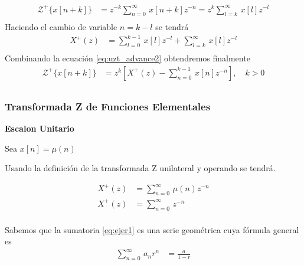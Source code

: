 \documentclass[12pt]{article}
\begin{document}
\begin{equation}
    \begin{split}
        \mathscr{Z}^+\{x[n+k]\}&=z^{-k}\displaystyle\sum_{n=0}^{\infty}\,x[n+k]z^{-n}=z^{k}\displaystyle\sum_{l=k}^{\infty}\,x[l]z^{-l}\\
    \end{split}
    \label{eq:uzt_advance1}
\end{equation}
Haciendo el cambio de variable $n=k-l$ se tendrá
\begin{equation}
    \begin{split}
        X^+(z)&=\displaystyle\sum_{l=0}^{k-1}\,x[l]z^{-l}+\displaystyle\sum_{l=k}^{\infty}\,x[l]z^{-l}\\
    \end{split}
    \label{eq:uzt_advance2}
\end{equation}
Combinando la ecuación \ref{eq:uzt_advance2} obtendremos finalmente
\begin{equation}
    \begin{split}
        \mathscr{Z}^+\{x[n+k]\}&=z^{k}[X^+(z)-\displaystyle\sum_{n=0}^{k-1}\,x[n]z^{-n}], \quad k>0\\
    \end{split}
    \label{eq:uzt_advance3}
\end{equation}
\subsubsection{Transformada Z de Funciones Elementales}

\textbf{Escalon Unitario}
\vspace{5mm}

Sea $x[n]=\mu(n)$

\vspace{5mm}
Usando la definición de la transformada Z unilateral y operando se tendrá.

\begin{equation}
    \begin{split}
        X^+(z)&=\displaystyle\sum_{n=0}^{\infty}\,\mu(n)z^{-n}\\
        X^+(z)&=\displaystyle\sum_{n=0}^{\infty}\,z^{-n}\\
    \end{split}
    \label{eq:ejer1}
\end{equation}

Sabemos que la sumatoria \ref{eq:ejer1} es una serie geométrica cuya fórmula general es
\begin{equation}
    \begin{split}
        \displaystyle\sum_{n=0}^{\infty}\,a_{n}r^{n}&=\frac{a}{1-r}\\
    \end{split}
    \label{eq:ejer11}
\end{equation}
\end{document}
